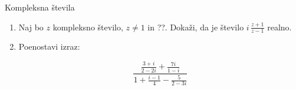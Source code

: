 \begin{frame}{Kompleksna števila}
	\begin{enumerate}
		\item
		Naj bo $z$ kompleksno število, $z \ne 1$ in ??.
		Dokaži, da je število \( i \, \frac{z+1}{z-1} \) realno.
		\item
		Poenostavi izraz:

		
		\begin{equation*}
			\frac{\frac{3 + i}{2 - 2i} + \frac{7i}{1 - i}}{1 + \frac{i - 1}{4} - \frac{5}{2 - 3i}}
			\end{equation*}
			
		
	\end{enumerate}
\end{frame}